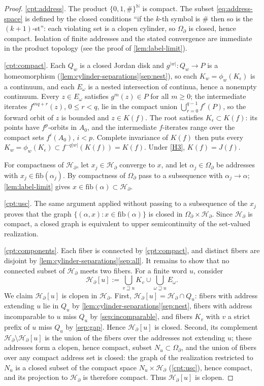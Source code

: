 \documentclass[11pt,reqno]{amsart}
\numberwithin{equation}{section}
\theoremstyle{plain}
\theoremstyle{definition}
\theoremstyle{remark}
\newcommand{\N}{\mathbb N}
\newcommand{\OmB}{\Omega_\partial}
\newcommand{\HB}{\mathcal H_\partial}
\newcommand{\rootK}{K_{\epsilon}}
\begin{document}
\begin{proof}
\ref{cpt:address}.  The product $\{0,1,\#\}^{\N}$ is compact.  The
subset \eqref{eq:address-space} is defined by the closed conditions
``if the $k$-th symbol is $\#$ then so is the $(k+1)$-st'': each
violating set is a clopen cylinder, so $\OmB$ is closed, hence compact.
Isolation of finite addresses and the stated convergence are immediate
in the product topology (see the proof of \cref{lem:label-limit}).

\ref{cpt:compact}.  Each $Q_w$ is a closed Jordan disk and
$g^{|w|}\colon Q_w\to P$ is a homeomorphism
(\cref{lem:cylinder-separations}\ref{sep:nest}), so each
$K_w=\phi_w(\rootK)$ is a continuum, and each $E_\omega$ is a nested
intersection of continua, hence a nonempty continuum.  Every
$z\in E_\omega$ satisfies $g^m(z)\in P$ for all $m\ge0$; the
intermediate iterates $f^{mq+r}(z)$, $0\le r<q$, lie in the compact
union $\bigcup_{r=0}^{q-1}f^r(P)$, so the forward orbit of $z$ is
bounded and $z\in K(f)$.  The root satisfies $\rootK\subset K(f)$: its
points have $f^p$-orbits in $A_0$, and the intermediate $f$-iterates
range over the compact sets $f^i(A_0)$, $i<p$.  Complete invariance of
$K(f)$ then puts every
$K_w=\phi_w(\rootK)\subset f^{-q|w|}(K(f))=K(f)$.  Under \ref{H3},
$K(f)=J(f)$.

For compactness of $\HB$, let $x_j\in\HB$ converge to $x$, and let
$\alpha_j\in\OmB$ be addresses with $x_j\in\mathrm{fib}(\alpha_j)$.  By
compactness of $\OmB$ pass to a subsequence with $\alpha_j\to\alpha$;
\cref{lem:label-limit} gives $x\in\mathrm{fib}(\alpha)\subset\HB$.

\ref{cpt:usc}.  The same argument applied without passing to a
subsequence of the $x_j$ proves that the graph
$\{(\alpha,x):x\in\mathrm{fib}(\alpha)\}$ is closed in $\OmB\times\HB$.
Since $\HB$ is compact, a closed graph is equivalent to upper
semicontinuity of the set-valued realization.

\ref{cpt:components}.  Each fiber is connected by \ref{cpt:compact}, and
distinct fibers are disjoint by
\cref{lem:cylinder-separations}\ref{sep:all}.  It remains to show that
no connected subset of $\HB$ meets two fibers.  For a finite word $u$,
consider
\[
 \HB[u]:=\bigcup_{v\sqsupseteq u}K_v
 \cup\bigcup_{\omega\sqsupseteq u}E_\omega .
\]
We claim $\HB[u]$ is clopen in $\HB$.  First,
$\HB[u]=\HB\cap Q_u$: fibers with address extending $u$ lie in $Q_u$ by
\cref{lem:cylinder-separations}\ref{sep:nest}, fibers with address
incomparable to $u$ miss $Q_u$ by \ref{sep:incomparable}, and fibers
$K_v$ with $v$ a strict prefix of $u$ miss $Q_u$ by \ref{sep:gap}.
Hence $\HB[u]$ is closed.  Second, its complement $\HB\setminus\HB[u]$
is the union of the fibers over the addresses not extending $u$; these
addresses form a clopen, hence compact, subset $N_u\subset\OmB$, and
the union of fibers over any compact address set is closed: the graph
of the realization restricted to $N_u$ is a closed subset of the
compact space $N_u\times\HB$ (\ref{cpt:usc}), hence compact, and its
projection to $\HB$ is therefore compact.  Thus $\HB[u]$ is clopen.


\end{proof}
\end{document}
